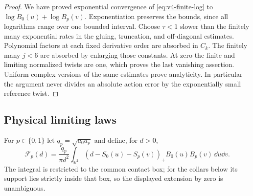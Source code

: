 \begin{proof}
We have proved exponential convergence of \eqref{eq:v4-finite-log}
to $\log B_0(u)+\log B_p(v)$. Exponentiation preserves the bounds,
since all logarithms range over one bounded interval. Choose $\tau<1$
slower than the finitely many exponential rates in the gluing,
truncation, and off-diagonal estimates. Polynomial factors at each
fixed derivative order are absorbed in $C_k$. The finitely many
$j<6$ are absorbed by enlarging those constants. At zero the finite
and limiting normalized twists are one, which proves the last
vanishing assertion. Uniform complex versions of the same estimates
prove analyticity. In particular the argument never divides an
absolute action error by the exponentially small reference twist.
\end{proof}

\subsection{Physical limiting laws}
For $p\in\{0,1\}$ let $q_p=\sqrt{a_0a_p}$ and define, for $d>0$,
\begin{equation}\label{eq:v4-limit-integral}
 \mathcal F_p(d)=\frac{q_p}{\pi d^2}
 \int_{\mathbb R^2}(d-S_0(u)-S_p(v))_+B_0(u)B_p(v)\,\dd u\dd v.
\end{equation}
The integral is restricted to the common contact box; for the collars
below its support lies strictly inside that box, so the displayed
extension by zero is unambiguous.

